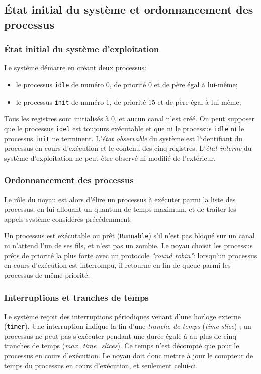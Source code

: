 \documentclass[french, toc]{../cs-classes/cs-classes}
\begin{document}
\subsection{État initial du système et ordonnancement des processus}
\subsubsection{État initial du système d'exploitation}
Le système démarre en créant deux processus:
\begin{itemize}
    \item le processus \texttt{idle} de numéro 0, de priorité 0 et de père égal à lui-même;
    \item le processus \texttt{init} de numéro 1, de priorité 15 et de père égal à lui-même;
\end{itemize}
Tous les registres sont initialisés à 0, et aucun canal n'est créé. On peut supposer que le processus \texttt{idel} est toujours exécutable et que ni le processus \texttt{idle} ni le processus \texttt{init} ne terminent. L'\emph{état observable} du système est l'identifiant du processus en cours d'exécution et le contenu des cinq registres. L'\emph{état interne} du système d'exploitation ne peut être observé ni modifié de l'extérieur. 

\subsubsection{Ordonnancement des processus}
Le rôle du noyau est alors d'élire un processus à exécuter parmi la liste des processus, en lui allouant un quantum de temps maximum, et de traiter les appels système considérés précédemment. 

Un processus est exécutable ou prêt (\texttt{Runnable}) s'il n'est pas bloqué sur un canal ni n'attend l'un de ses fils, et n'est pas un zombie. Le noyau choisit les processus prêts de priorité la plus forte avec un protocole \emph{"round robin"}: lorsqu'un processus en cours d'exécution est interrompu, il retourne en fin de queue parmi les processus de même priorité.

\subsubsection{Interruptions et tranches de temps}
Le système reçoit des interruptions périodiques venant d'une horloge externe (\texttt{timer}). Une interruption indique la fin d'une \emph{tranche de temps} (\emph{time slice}) ; un processus ne peut pas s'exécuter pendant une durée égale à au plus de cinq tranches de temps (\emph{max\_time\_slices}). Ce temps n'est décompté que pour le processus en cours d'exécution. Le noyau doit donc mettre à jour le compteur de temps du processus en cours d'exécution, et seulement celui-ci.
\end{document}
